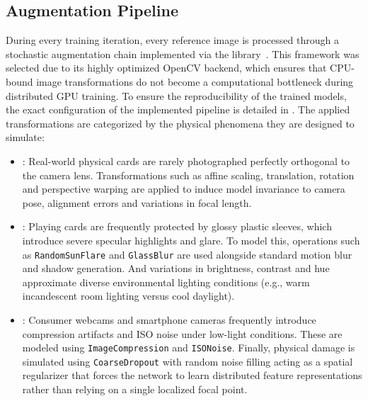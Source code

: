 \subsection{Augmentation Pipeline}
During every training iteration, every reference image is processed through a stochastic augmentation chain implemented via the  library~\cite{buslaev2020albumentations}. This framework was selected due to its highly optimized OpenCV backend, which ensures that CPU-bound image transformations do not become a computational bottleneck during distributed GPU training. To ensure the reproducibility of the trained models, the exact configuration of the implemented pipeline is detailed in . The applied transformations are categorized by the physical phenomena they are designed to simulate:
\begin{itemize}
    \item {}: Real-world physical cards are rarely photographed perfectly orthogonal to the camera lens. Transformations such as affine scaling, translation, rotation and perspective warping are applied to induce model invariance to camera pose, alignment errors and variations in focal length.
    \item {}: Playing cards are frequently protected by glossy plastic sleeves, which introduce severe specular highlights and glare. To model this, operations such as \texttt{RandomSunFlare} and \texttt{GlassBlur} are used alongside standard motion blur and shadow generation. And variations in brightness, contrast and hue approximate diverse environmental lighting conditions (e.g., warm incandescent room lighting versus cool daylight).
    \item {}: Consumer webcams and smartphone cameras frequently introduce compression artifacts and ISO noise under low-light conditions. These are modeled using \texttt{ImageCompression} and \texttt{ISONoise}. Finally, physical damage is simulated using \texttt{CoarseDropout} with random noise filling acting as a spatial regularizer that forces the network to learn distributed feature representations rather than relying on a single localized focal point.
\end{itemize}

